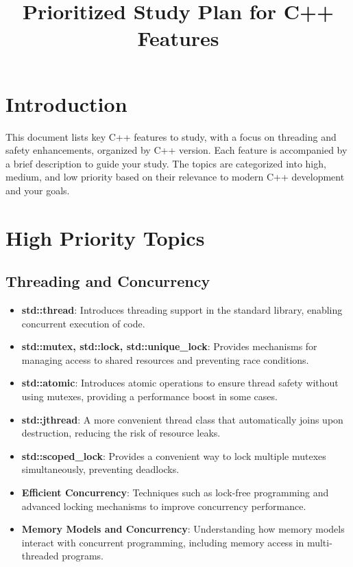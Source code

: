\documentclass{article}
\title{Prioritized Study Plan for C++ Features}
\date{}
\begin{document}
\maketitle

\section*{Introduction}

This document lists key C++ features to study, with a focus on threading and safety enhancements, organized by C++ version. Each feature is accompanied by a brief description to guide your study. The topics are categorized into high, medium, and low priority based on their relevance to modern C++ development and your goals.

\section*{High Priority Topics}

\subsection*{Threading and Concurrency}
\begin{itemize}
    \item \textbf{std::thread}:
    Introduces threading support in the standard library, enabling concurrent execution of code.

    \item \textbf{std::mutex, std::lock, std::unique\_lock}:
    Provides mechanisms for managing access to shared resources and preventing race conditions.

    \item \textbf{std::atomic}:
    Introduces atomic operations to ensure thread safety without using mutexes, providing a performance boost in some cases.

    \item \textbf{std::jthread}:
    A more convenient thread class that automatically joins upon destruction, reducing the risk of resource leaks.

    \item \textbf{std::scoped\_lock}:
    Provides a convenient way to lock multiple mutexes simultaneously, preventing deadlocks.

    \item \textbf{Efficient Concurrency}:
    Techniques such as lock-free programming and advanced locking mechanisms to improve concurrency performance.

    \item \textbf{Memory Models and Concurrency}:
    Understanding how memory models interact with concurrent programming, including memory access in multi-threaded programs.
\end{itemize}
\end{document}
